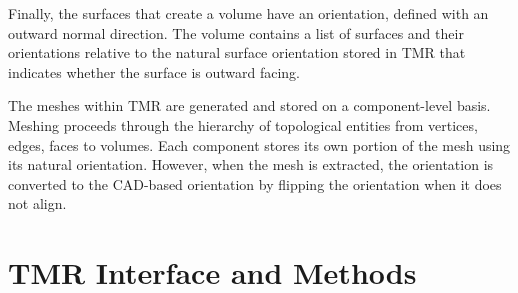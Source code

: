 \documentclass[12pt]{article}
\begin{document}
Finally, the surfaces that create a volume have an orientation, defined with an outward normal direction.
The volume contains a list of surfaces and their orientations relative to the natural surface orientation stored in TMR that indicates whether the surface is outward facing.

The meshes within TMR are generated and stored on a component-level basis.
Meshing proceeds through the hierarchy of topological entities from vertices, edges, faces to volumes.
Each component stores its own portion of the mesh using its natural orientation.
However, when the mesh is extracted, the orientation is converted to the CAD-based orientation by flipping the orientation when it does not align. 

\section{TMR Interface and Methods}




\end{document}
